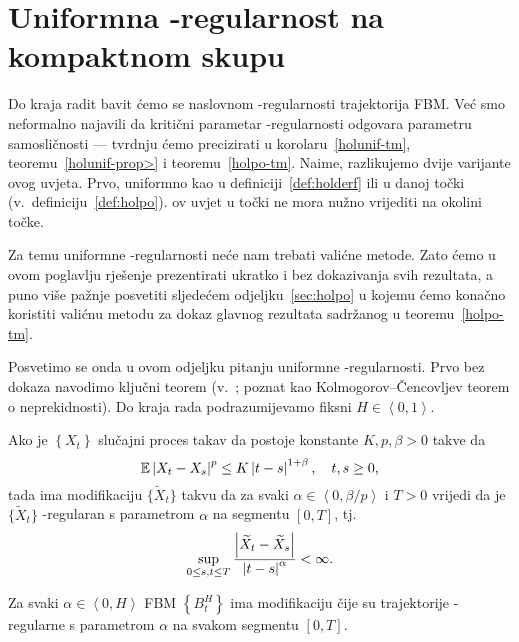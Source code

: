 \documentclass[main.tex]{subfiles}
\begin{document}
\nocite{*}

\section{Uniformna \holder -regularnost na kompaktnom skupu}\label{sec:holunif}
Do kraja radit bavit ćemo se naslovnom \holder -regularnosti
trajektorija FBM. Već smo neformalno najavili da kritični parametar \holder -regularnosti
odgovara parametru samosličnosti --- tvrdnju ćemo precizirati u
korolaru~\ref{holunif-tm}, teoremu~\ref{holunif-prop>} i teoremu~\ref{holpo-tm}. Naime,
razlikujemo dvije varijante \holder ovog uvjeta. Prvo, uniformno
kao u definiciji~\ref{def:holderf} ili u danoj točki
(v.\ definiciju~\ref{def:holpo}). \holder ov uvjet u točki ne mora nužno
vrijediti na okolini točke.

Za temu uniformne \holder -regularnosti neće nam trebati
valićne metode. Zato ćemo u ovom poglavlju rješenje prezentirati
ukratko i bez dokazivanja svih rezultata, a puno više pažnje
posvetiti sljedećem odjeljku~\ref{sec:holpo} u kojemu
ćemo konačno koristiti valićnu metodu za dokaz glavnog rezultata sadržanog
u teoremu~\ref{holpo-tm}.

Posvetimo se onda u ovom odjeljku pitanju uniformne \holder -regularnosti.
Prvo bez dokaza navodimo ključni teorem (v.~\cite[tm.~3.1]{se}; poznat kao Kolmogorov--Čencovljev teorem o neprekidnosti). Do kraja
rada podrazumijevamo fiksni \( H \in \left\langle 0,1 \right\rangle \).

\begin{teorem}\label{holunif-setm}
	Ako je \( \left\{ X_t \right\} \) slučajni proces takav da
	postoje konstante \( K, p, \beta > 0 \) takve da
	\begin{equation}
		\mathbb{E} \left| {X_t-X_s} \right|^p \le K \left| {t-s} \right|^{1+\beta}, \quad t,s \ge 0,
	\end{equation}
	tada ima modifikaciju \( \bigl\{ \widetilde X_t \bigr\} \)
	takvu da za svaki \( \alpha \in \left\langle 0, \beta/p \right\rangle \)
	i \( T > 0 \) vrijedi da je \( \bigl\{ \widetilde X_t \bigr\} \)
	\holder-regularan s parametrom \( \alpha \) na segmentu \( \left[ 0,T \right] \), tj.\
	\begin{equation}
		\sup\limits_{0 \le s, t \le T}
		\frac{\left| {\widetilde X_t-\widetilde X_s} \right|}{\left| {t-s} \right|^\alpha} < \infty.
	\end{equation}
\end{teorem}

\begin{korolar}\label{holunif-tm}
	Za svaki \( \alpha \in \left\langle0,H\right\rangle  \) FBM \( \left\{ B^H_t \right\} \) ima modifikaciju
	čije su trajektorije \holder -regularne s parametrom \( \alpha \) na svakom segmentu
	\( \left[ 0,T \right] \).
\end{korolar}
\end{document}
